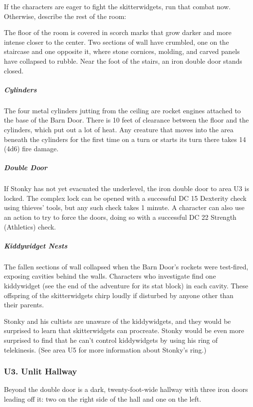 \documentclass[10pt,a4paper,twoside,bg=print,twocolumn,openany,nodeprecatedcode]{dndbook}
\begin{document}
If the characters are eager to fight the skitterwidgets, run that combat now. Otherwise, describe the rest of the room:

\begin{DndReadAloud}{}
The floor of the room is covered in scorch marks that grow darker and more intense closer to the center. Two sections of wall have crumbled, one on the staircase and one opposite it, where stone cornices, molding, and carved panels have collapsed to rubble. Near the foot of the stairs, an iron double door stands closed.

\end{DndReadAloud}

\subparagraph{Cylinders}
The four metal cylinders jutting from the ceiling are rocket engines attached to the base of the Barn Door. There is 10 feet of clearance between the floor and the cylinders, which put out a lot of heat. Any creature that moves into the area beneath the cylinders for the first time on a turn or starts its turn there takes 14 (4d6) fire damage.

\subparagraph{Double Door}
If Stonky has not yet evacuated the underlevel, the iron double door to area U3 is locked. The complex lock can be opened with a successful DC 15 Dexterity check using thieves' tools, but any such check takes 1 minute. A character can also use an action to try to force the doors, doing so with a successful DC 22 Strength (Athletics) check.

\subparagraph{Kiddywidget Nests}
The fallen sections of wall collapsed when the Barn Door's rockets were test-fired, exposing cavities behind the walls. Characters who investigate find one kiddywidget (see the end of the adventure for its stat block) in each cavity. These offspring of the skitterwidgets chirp loudly if disturbed by anyone other than their parents.

Stonky and his cultists are unaware of the kiddywidgets, and they would be surprised to learn that skitterwidgets can procreate. Stonky would be even more surprised to find that he can't control kiddywidgets by using his ring of telekinesis. (See area U5 for more information about Stonky's ring.)

\subsubsection{U3. Unlit Hallway}
\begin{DndReadAloud}{}
Beyond the double door is a dark, twenty-foot-wide hallway with three iron doors leading off it: two on the right side of the hall and one on the left.

\end{DndReadAloud}
\end{document}
